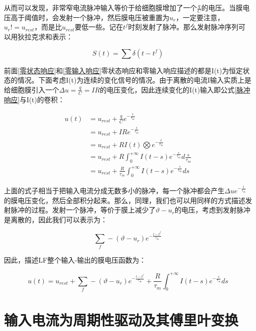 \documentclass[12pt, a4paper, oneside]{ctexbook}
\begin{document}
从而可以发现，非常窄电流脉冲输入等价于给细胞膜增加了一个$\frac{q}{C}$的电压。当膜电压高于阈值时，会发射一个脉冲，然后膜电压被重置为$u_{r}$，一定要注意，$u_{r}!=u_{rest}$，而是比$u_{rest}$要低一些。记在$t^f$时刻发射了脉冲。那么发射脉冲序列可以用狄拉克求和表示：

\begin{equation}
    S(t)=\sum \delta (t-t^f)
\end{equation}

前面\ref*{零状态响应}和\ref*{零输入响应}零状态响应和零输入响应描述的都是I(t)为恒定状态的情况。下面考虑I(t)为连续的变化信号的情况。由于离散的电流I输入实质上是给细胞膜引入一个$\Delta u=\frac{q}{C}=IR$的电压变化，因此连续变化的I(t)输入即公式\ref*{脉冲响应}与I(t)的卷积：

\begin{equation}
    \begin{aligned}
        u(t)&=u_{rest}+\frac{q}{C}e^{-\frac{t}{\tau_m}}\\
        &=u_{rest}+IRe^{-\frac{t}{\tau_m}}\\
        &=u_{rest}+RI(t)\bigotimes e^{-\frac{t}{\tau_m}}\\
        &=u_{rest}+R\int_0^{+\infty}I(t-s)e^{-\frac{s}{\tau_m}}d\frac{s}{\tau_m}\\
        &=u_{rest}+\frac{R}{\tau_m}\int_0^{+\infty}I(t-s)e^{-\frac{s}{\tau_m}}ds
    \end{aligned}
    \label{卷积}
\end{equation}

上面的式子相当于把输入电流分成无数多小的脉冲，每一个脉冲都会产生$\Delta ue^{-\frac{t}{\tau_m}}$的膜电压变化，然后全部积分起来。那么，同理，我们也可以用同样的方式描述发射脉冲的过程。发射一个脉冲，等价于膜上减少了$\vartheta -u_{r}$的电压，考虑到发射脉冲是离散的，因此我们可以表示为：

\begin{equation}
    \sum_f -(\vartheta -u_{r})e^{-\frac{t-t^f}{\tau_m}}
\end{equation}

因此，描述LF整个输入-输出的膜电压函数为：

\begin{equation}
    u(t)=u_{rest}+\sum_f -(\vartheta -u_{r})e^{-\frac{t-t^f}{\tau_m}}+\frac{R}{\tau_m}\int_0^{+\infty}I(t-s)e^{-\frac{s}{\tau_m}}ds
\end{equation}

\section{输入电流为周期性驱动及其傅里叶变换}
\end{document}

